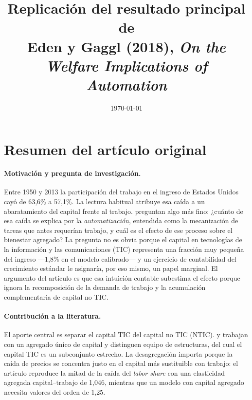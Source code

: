\documentclass[12pt,letterpaper]{article}
\title{\vspace{-1.5cm}\large\textbf{Replicación del resultado principal de\\
Eden y Gaggl (2018), \emph{On the Welfare Implications of Automation}}}
\author{}
\date{\today}
\begin{document}
\maketitle
\vspace{-1cm}

\section{Resumen del artículo original}

\paragraph{Motivación y pregunta de investigación.}
Entre 1950 y 2013 la participación del trabajo en el ingreso de Estados Unidos
cayó de 63,6\% a 57,1\%. La lectura habitual atribuye esa caída a un abaratamiento
del capital frente al trabajo. \citet{eden2018} preguntan algo más fino: ¿cuánto de
esa caída se explica por la \emph{automatización}, entendida como la mecanización
de tareas que antes requerían trabajo, y cuál es el efecto de ese proceso sobre el
bienestar agregado? La pregunta no es obvia porque el capital en tecnologías de la
información y las comunicaciones (TIC) representa una fracción muy pequeña del
ingreso —1,8\% en el modelo calibrado— y un ejercicio de contabilidad del
crecimiento estándar le asignaría, por eso mismo, un papel marginal. El argumento
del artículo es que esa intuición contable subestima el efecto porque ignora la
recomposición de la demanda de trabajo y la acumulación complementaria de capital
no TIC.

\paragraph{Contribución a la literatura.}
El aporte central es separar el capital TIC del capital no TIC (NTIC).
\citet{karabarbounis2014} y \citet{autor2013} trabajan con un agregado único de
capital y \citet{krusell2000} distinguen equipo de estructuras, del cual el capital
TIC es un subconjunto estrecho. La desagregación importa porque la caída de precios
se concentra justo en el capital más sustituible con trabajo: el artículo reproduce
la mitad de la caída del \emph{labor share} con una elasticidad agregada
capital--trabajo de 1,046, mientras que un modelo con capital agregado necesita
valores del orden de 1,25.
\end{document}
